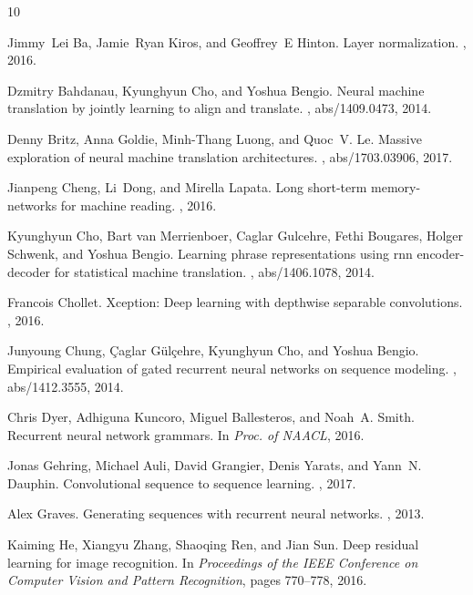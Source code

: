 \documentclass{article}
\begin{document}
\begin{thebibliography}{10}

Jimmy~Lei Ba, Jamie~Ryan Kiros, and Geoffrey~E Hinton.
\newblock Layer normalization.
, 2016.

Dzmitry Bahdanau, Kyunghyun Cho, and Yoshua Bengio.
\newblock Neural machine translation by jointly learning to align and
  translate.
, abs/1409.0473, 2014.

Denny Britz, Anna Goldie, Minh{-}Thang Luong, and Quoc~V. Le.
\newblock Massive exploration of neural machine translation architectures.
, abs/1703.03906, 2017.

Jianpeng Cheng, Li~Dong, and Mirella Lapata.
\newblock Long short-term memory-networks for machine reading.
, 2016.

Kyunghyun Cho, Bart van Merrienboer, Caglar Gulcehre, Fethi Bougares, Holger
  Schwenk, and Yoshua Bengio.
\newblock Learning phrase representations using rnn encoder-decoder for
  statistical machine translation.
, abs/1406.1078, 2014.

Francois Chollet.
\newblock Xception: Deep learning with depthwise separable convolutions.
, 2016.

Junyoung Chung, {\c{C}}aglar G{\"{u}}l{\c{c}}ehre, Kyunghyun Cho, and Yoshua
  Bengio.
\newblock Empirical evaluation of gated recurrent neural networks on sequence
  modeling.
, abs/1412.3555, 2014.

Chris Dyer, Adhiguna Kuncoro, Miguel Ballesteros, and Noah~A. Smith.
\newblock Recurrent neural network grammars.
\newblock In {\em Proc. of NAACL}, 2016.

Jonas Gehring, Michael Auli, David Grangier, Denis Yarats, and Yann~N. Dauphin.
\newblock Convolutional sequence to sequence learning.
, 2017.

Alex Graves.
\newblock Generating sequences with recurrent neural networks.
, 2013.

Kaiming He, Xiangyu Zhang, Shaoqing Ren, and Jian Sun.
\newblock Deep residual learning for image recognition.
\newblock In {\em Proceedings of the IEEE Conference on Computer Vision and
  Pattern Recognition}, pages 770--778, 2016.


\end{thebibliography}
\end{document}
